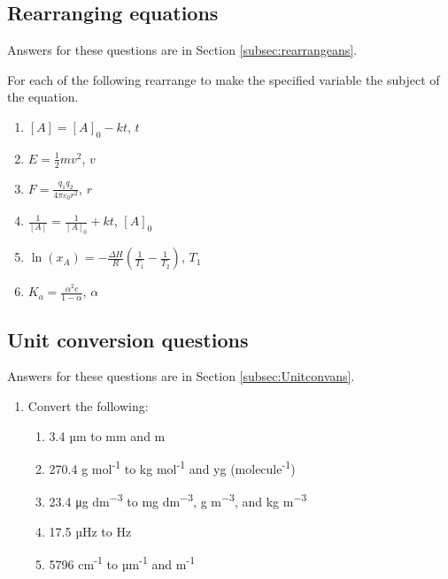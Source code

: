 \documentclass[
]{book}
\providecommand{\tightlist}{%
  \setlength{\itemsep}{0pt}\setlength{\parskip}{0pt}}
\begin{document}
\hypertarget{subsec:rearrange}{%
\subsection{Rearranging equations}\label{subsec:rearrange}}

Answers for these questions are in Section \ref{subsec:rearrangeans}.

For each of the following rearrange to make the specified variable the subject of the equation.

\begin{enumerate}
\def\labelenumi{\arabic{enumi}.}
\tightlist
\item
  \([A]= [A]_0 - kt\), \(t\)
\item
  \(E = \frac{1}{2}mv^2\), \(v\)
\item
  \(F = \frac{q_1 q_2}{4 \pi \varepsilon _0 r^2}\), \(r\)
\item
  \(\frac{1}{[A]}=\frac{1}{[A]_0}+kt\), \([A]_0\)
\item
  \(\ln (x_A)=-\frac{\Delta H}{R}(\frac{1}{T_1}-\frac{1}{T_2})\), \(T_1\)
\item
  \(K_a=\frac{\alpha ^2 c}{1- \alpha}\), \(\alpha\)
\end{enumerate}

\hypertarget{subsec:Unitconv}{%
\subsection{Unit conversion questions}\label{subsec:Unitconv}}

Answers for these questions are in Section \ref{subsec:Unitconvans}.

\begin{enumerate}
\def\labelenumi{\arabic{enumi}.}
\tightlist
\item
  Convert the following:

  \begin{enumerate}
  \def\labelenumii{\alph{enumii}.}
  \tightlist
  \item
    3.4 µm to mm and m
  \item
    270.4 g mol\textsuperscript{-1} to kg mol\textsuperscript{-1} and yg (molecule\textsuperscript{-1})
  \item
    23.4 μg dm\textsuperscript{−3} to mg dm\textsuperscript{−3}, g m\textsuperscript{−3}, and kg m\textsuperscript{−3}
  \item
    17.5 µHz to Hz
  \item
    5796 cm\textsuperscript{-1} to µm\textsuperscript{-1} and m\textsuperscript{-1}
  \end{enumerate}
\end{enumerate}
\end{document}
